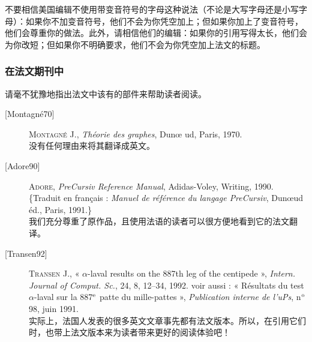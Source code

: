 不要相信美国编辑不使用带变音符号的字母这种说法（不论是大写字母还是小写字母）：如果你不加变音符号，他们不会为你凭空加上；但如果你加上了变音符号，他们会尊重你的做法。此外，请相信他们的编辑：如果你的引用写得太长，他们会为你改短；但如果你不明确要求，他们不会为你凭空加上法文的标题。

\subsubsection*{在法文期刊中}

请毫不犹豫地指出法文中该有的部件来帮助读者阅读。

\begin{description}
    \item[{[Montagné70]}] \textsc{Montagné} J., \emph{Théorie des graphes}, Dunœ ud, Paris, 1970.\\
    没有任何理由来将其翻译成英文。
    \item[{[Adore90]}] \textsc{Adore}, \emph{PreCursiv Reference Manual}, Adidas-Voley, Writing, 1990. \{Traduit en français : \emph{Manuel de référence du langage PreCursiv}, Dunœud éd., Paris, 1991.\}\\
    我们充分尊重了原作品，且使用法语的读者可以很方便地看到它的法文翻译。
    \item[{[Transen92]}] \textsc{Transen} J., « $\alpha$-laval results on the 887th leg of the centipede », \emph{Intern. Journal of Comput. Sc.}, 24, 8, 12–34, 1992. {voir aussi : « Résultats du test $\alpha$-laval sur la 887$^{\rm e}$ patte du mille-pattes », \emph{Publication interne de l'uPs}, n$^{\rm o}$ 98, juin 1991.}\\
    实际上，法国人发表的很多英文文章事先都有法文版本。所以，在引用它们时，也带上法文版本来为读者带来更好的阅读体验吧！
\end{description}